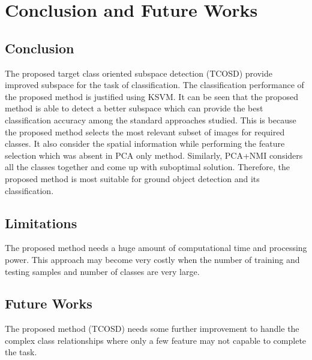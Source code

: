 \documentclass[document.tex]{subfiles}
\begin{document}
\chapter{Conclusion and Future Works}

\section{Conclusion}
\noindent The proposed target class oriented subspace detection (TCOSD) provide improved subspace for the task of classification. The classification performance of the proposed method is justified using KSVM. It can be seen that the proposed method is able to detect a better subspace which can provide the best classification accuracy among the standard approaches studied. This is because the proposed method selects the most relevant subset of images for required classes. It also consider the spatial information while performing the feature selection which was absent in PCA only method. Similarly, PCA+NMI considers all the classes together and come up with suboptimal solution. Therefore, the proposed method is most suitable for ground object detection and its classification.
\section{Limitations}
\noindent The proposed method needs a huge amount of computational time and processing power. This approach may become very costly when the number of training and testing samples and number of classes are very large.
\section{Future Works}
The proposed method (TCOSD) needs some further improvement to handle the complex class relationships where only a few feature may not capable to complete the task.
\end{document}

